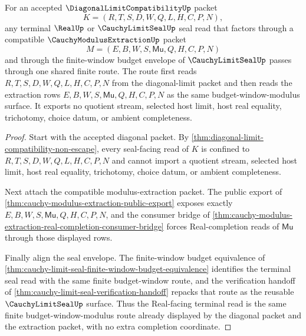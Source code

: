 \begin{theorem}
\label{thm:diagonal-limit-compatibility-shared-modulus-terminal-seal}
For an accepted $\DiagonalLimitCompatibilityUp$ packet
$$
K=(R,T,S,D,W,Q,L,H,C,P,N),
$$
any terminal $\RealUp$ or $\CauchyLimitSealUp$ seal read that factors through a compatible $\CauchyModulusExtractionUp$ packet
$$
M=(E,B,W,S,\mathsf{Mu},Q,H,C,P,N)
$$
and through the finite-window budget envelope of $\CauchyLimitSealUp$ passes through one shared finite route. The route first reads $R,T,S,D,W,Q,L,H,C,P,N$ from the diagonal-limit packet and then reads the extraction rows $E,B,W,S,\mathsf{Mu},Q,H,C,P,N$ as the same budget-window-modulus surface. It exports no quotient stream, selected host limit, host real equality, trichotomy, choice datum, or ambient completeness.
\end{theorem}
\begin{proof}
Start with the accepted diagonal packet. By \autoref{thm:diagonal-limit-compatibility-non-escape}, every seal-facing read of $K$ is confined to $R,T,S,D,W,Q,L,H,C,P,N$ and cannot import a quotient stream, selected host limit, host real equality, trichotomy, choice datum, or ambient completeness.

Next attach the compatible modulus-extraction packet. The public export of \autoref{thm:cauchy-modulus-extraction-public-export} exposes exactly $E,B,W,S,\mathsf{Mu},Q,H,C,P,N$, and the consumer bridge of \autoref{thm:cauchy-modulus-extraction-real-completion-consumer-bridge} forces Real-completion reads of $\mathsf{Mu}$ through those displayed rows.

Finally align the seal envelope. The finite-window budget equivalence of \autoref{thm:cauchy-limit-seal-finite-window-budget-equivalence} identifies the terminal seal read with the same finite budget-window route, and the verification handoff of \autoref{thm:cauchy-limit-seal-verification-handoff} repacks that route as the reusable $\CauchyLimitSealUp$ surface. Thus the Real-facing terminal read is the same finite budget-window-modulus route already displayed by the diagonal packet and the extraction packet, with no extra completion coordinate.
\end{proof}

